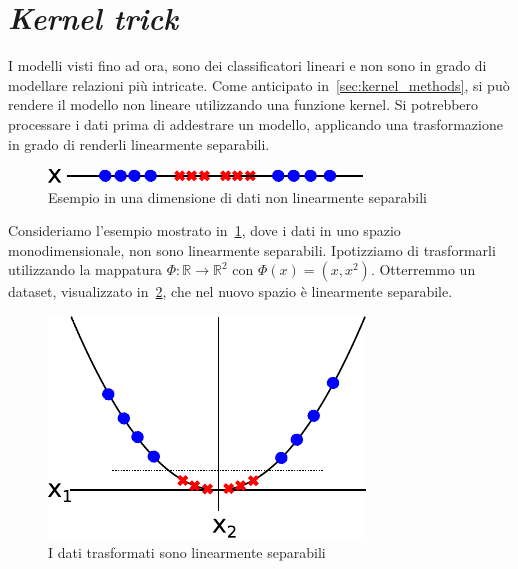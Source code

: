 \section{\emph{Kernel trick}}\label{sec:kernel_trick}
I modelli visti fino ad ora, sono dei classificatori lineari e non sono in grado di modellare relazioni più intricate.
Come anticipato in~\cref{sec:kernel_methods}, si può rendere il modello non lineare utilizzando una funzione kernel.
Si potrebbero processare i dati prima di addestrare un modello, applicando una trasformazione in grado di renderli linearmente separabili.
\begin{figure}[ht]
    \centering
    \includegraphics[width=0.5\linewidth]{img/non_linearmente_separabili.pdf}
    \caption{Esempio in una dimensione di dati non linearmente separabili}
    \label{fig:kerneltrick:non_lin_sep}
\end{figure}
Consideriamo l'esempio mostrato in~\cref{fig:kerneltrick:non_lin_sep}, dove i dati in uno spazio monodimensionale, non sono linearmente separabili. Ipotizziamo di trasformarli utilizzando la mappatura $\Phi:\mathbb{R} \rightarrow \mathbb{R}^2$ con $\Phi(x) = (x, x^2)$. Otterremmo un dataset, visualizzato in~\cref{fig:kerneltrick:visualized}, che nel nuovo spazio è linearmente separabile.
\begin{figure}[ht]
    \centering
    \includegraphics[width=0.5\linewidth]{img/kernel_trick_visualized.pdf}
    \caption{I dati trasformati sono linearmente separabili}
    \label{fig:kerneltrick:visualized}
\end{figure}


